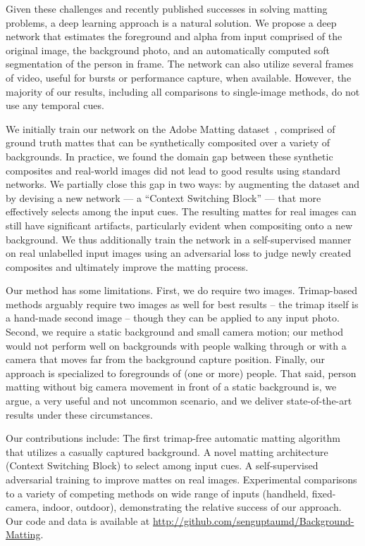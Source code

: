 \documentclass[10pt,twocolumn,letterpaper]{article}
\begin{document}
Given these challenges and recently published successes in solving matting problems, a deep learning approach is a natural solution.  We propose a deep network that estimates the foreground and alpha from input comprised of the original image, the background photo, and an automatically computed soft segmentation of the person in frame.  The network can also utilize several frames of video, useful for bursts or performance capture, when available. However, the majority of our results, including all comparisons to single-image methods, do not use any temporal cues.

We initially train our network on the Adobe Matting dataset~\cite{xu2017deep}, comprised of ground truth mattes that can be synthetically composited over a variety of backgrounds.  In practice, we found the domain gap between these synthetic composites and real-world images did not lead to good results using standard networks.  We partially close this gap in two ways: by augmenting the dataset and by devising a new network — a “Context Switching Block” — that more effectively selects among the input cues.  The resulting mattes for real images can still have significant artifacts, particularly evident when compositing onto a new background.  We thus additionally train the network in a self-supervised manner on real unlabelled input images using an adversarial loss to judge newly created composites and ultimately improve the matting process.

Our method has some limitations.  First, we do require two images.  Trimap-based methods arguably require two images as well for best results -- the trimap itself is a hand-made second image -- though they can be applied to any input photo.  Second, we require a static background and small camera motion; our method would not perform well on backgrounds with people walking through or with a camera that moves far from the background capture position.  Finally, our approach is specialized to foregrounds of (one or more) people.
That said, person matting without big camera movement in front of a static background is, we argue, a very useful and not uncommon scenario, and we deliver state-of-the-art results under these circumstances.



Our contributions include:  The first trimap-free automatic matting algorithm that utilizes a casually captured background.  A novel matting architecture (Context Switching Block) to select among input cues.  A self-supervised adversarial training to improve mattes on real images.  Experimental comparisons to a variety of competing methods on wide range of inputs (handheld, fixed-camera, indoor, outdoor), demonstrating the relative success of our approach. Our code and data is available at {\footnotesize \url{http://github.com/senguptaumd/Background-Matting}}.
\end{document}
